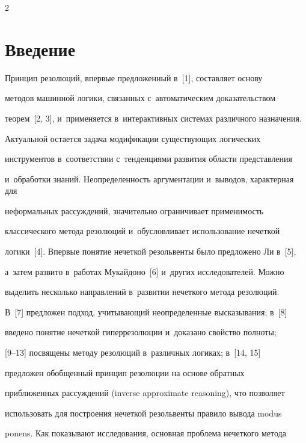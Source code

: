 \begin{multicols}{2}





\label{st\stat}





\section{Введение}





  Принцип резолюций, впервые предложенный в~[1], составляет основу 


методов машинной логики, связанных с~автоматическим доказательством 


теорем~[2, 3], и~применяется в~интерактивных системах различного назначения. 


Актуальной остается задача модификации существующих логических 


инструментов в~соответствии с~тенденциями развития области представления 


и~обработки знаний. Неопределенность аргументации и~выводов, характерная для 


неформальных рассуждений, значительно ограничивает применимость 


классического метода резолюций и~обусловливает использование нечеткой 


логики~[4]. Впервые понятие нечеткой резольвенты было предложено Ли в~[5], 


а~затем развито в~работах Мукайдоно~[6] и~других исследователей. Можно 


выделить несколько направлений в~развитии нечеткого метода резолюций. 


В~[7] предложен подход, учитывающий неопределенные высказывания; в~[8] 


введено понятие нечеткой гиперрезолюции и~доказано свойство полноты;  


[9--13] посвящены методу резолюций в~различных логиках; в~[14, 15] 


предложен обобщенный принцип резолюции на основе обратных 


приближенных рассуждений (inverse approximate reasoning), что позволяет 


использовать для построения нечеткой резольвенты правило вывода modus 


ponens. Как показывают исследования, основная проблема нечеткого метода 



\end{multicols}
